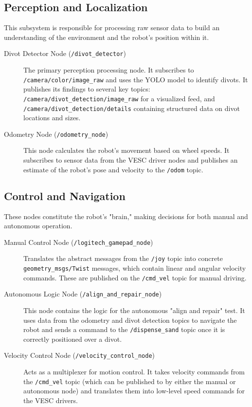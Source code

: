 \subsection{Perception and Localization}
This subsystem is responsible for processing raw sensor data to build an understanding of the environment and the robot's position within it.
\begin{description}
    \item[Divot Detector Node (\texttt{/divot\_detector})] The primary perception processing node. It subscribes to \texttt{/camera/color/image\_raw} and uses the YOLO model to identify divots. It publishes its findings to several key topics: \texttt{/camera/divot\_detection/image\_raw} for a visualized feed, and \texttt{/camera/divot\_detection/details} containing structured data on divot locations and sizes.
    \item[Odometry Node (\texttt{/odometry\_node})] This node calculates the robot's movement based on wheel speeds. It subscribes to sensor data from the \gls{VESC} driver nodes and publishes an estimate of the robot's pose and velocity to the \texttt{/odom} topic.
\end{description}

\subsection{Control and Navigation}
These nodes constitute the robot's "brain," making decisions for both manual and autonomous operation.
\begin{description}
    \item[Manual Control Node (\texttt{/logitech\_gamepad\_node})] Translates the abstract messages from the \texttt{/joy} topic into concrete \texttt{geometry\_msgs/Twist} messages, which contain linear and angular velocity commands. These are published on the \texttt{/cmd\_vel} topic for manual driving.
    \item[Autonomous Logic Node (\texttt{/align\_and\_repair\_node})] This node contains the logic for the autonomous "align and repair" test. It uses data from the odometry and divot detection topics to navigate the robot and sends a command to the \texttt{/dispense\_sand} topic once it is correctly positioned over a divot.
    \item[Velocity Control Node (\texttt{/velocity\_control\_node})] Acts as a multiplexer for motion control. It takes velocity commands from the \texttt{/cmd\_vel} topic (which can be published to by either the manual or autonomous node) and translates them into low-level speed commands for the VESC drivers.
\end{description}


